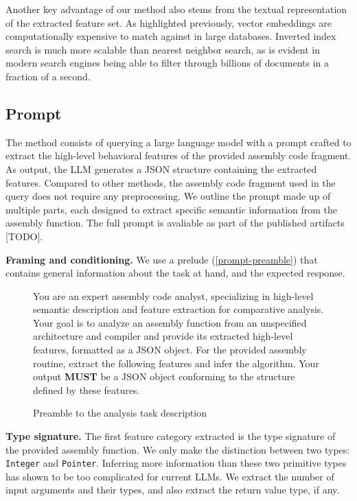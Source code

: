 Another key advantage of our method also stems from the textual representation of the extracted feature set. As highlighted
previously, vector embeddings are computationally expensive to match against in large databases. Inverted index search is much
more scalable than nearest neighbor search, as is evident in modern search engines being able to filter through billions of documents
in a fraction of a second.

\subsection{Prompt}

The method consists of querying a large language model with a prompt crafted to extract the high-level behavioral features of
the provided assembly code fragment. As output, the LLM generates a JSON structure containing the extracted features.
Compared to other methods, the assembly code fragment used in the query does not require any preprocessing.
We outline the prompt made up of multiple parts, each designed to extract specific semantic information from the
assembly function. The full prompt is avaliable as part of the published artifacts [TODO].

\noindent \textbf{Framing and conditioning.}
We use a prelude (\autoref{prompt-preamble}) that contains general information about the task at hand, and the expected response.

\begin{figure}
\centering
\begin{tcolorbox}[enhanced]
You are an expert assembly code analyst, specializing in high-level semantic description and feature extraction for comparative
analysis. Your goal is to analyze an assembly function from an unspecified architecture and compiler and provide its extracted
high-level features, formatted as a JSON object. For the provided assembly routine, extract the following features and infer the
algorithm. Your output \textbf{MUST} be a JSON object conforming to the structure defined by these features.
\end{tcolorbox}
\caption{Preamble to the analysis task description}
\label{prompt-preamble}
\end{figure}

\noindent \textbf{Type signature.}
The first feature category extracted is the type signature of the provided assembly function.
We only make the distinction between two types: \texttt{Integer} and \texttt{Pointer}. Inferring more information than these two 
primitive types has shown to be too complicated for current LLMs. We extract the number of input arguments
and their types, and also extract the return value type, if any.

